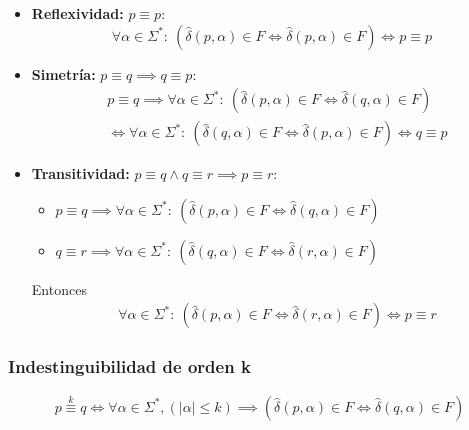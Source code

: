 \begin{demo}[0.8\textwidth]
  \begin{itemize}
    \item \textbf{Reflexividad:} \(p\equiv p\):
          \[ \forall \alpha \in \Sigma^*:~(\hat\delta(p,\alpha) \in F \iff \hat\delta(p,\alpha) \in F) \iff p \equiv p \]
    \item \textbf{Simetría:} \(p\equiv q \implies q\equiv p\):
          \begin{align*}
             & p \equiv q \implies \forall \alpha \in \Sigma^*:~(\hat\delta(p,\alpha) \in F \iff \hat\delta(q,\alpha) \in F)  \\
             & \iff \forall \alpha \in \Sigma^*:~(\hat\delta(q,\alpha) \in F \iff \hat\delta(p,\alpha) \in F) \iff q \equiv p
          \end{align*}
    \item \textbf{Transitividad:} \(p\equiv q \land q\equiv r \implies p\equiv r\):
          \begin{itemize}
            \item[] \(p \equiv q \implies \forall \alpha \in \Sigma^*:~(\hat\delta(p,\alpha) \in F \iff \hat\delta(q,\alpha) \in F)\)
            \item[] \(q \equiv r \implies \forall \alpha \in \Sigma^*:~(\hat\delta(q,\alpha) \in F \iff \hat\delta(r,\alpha) \in F)\)
          \end{itemize}
          Entonces
          \begin{align*}
             & \forall \alpha \in \Sigma^*:~(\hat\delta(p,\alpha) \in F \iff \hat\delta(r,\alpha) \in F) \iff p \equiv r
          \end{align*}
  \end{itemize}
\end{demo}

\subsubsection{Indestinguibilidad de orden k}
\[ p \overset{k}{\equiv} q \iff \forall \alpha\in\Sigma^*, (|\alpha|\leq k) \implies (\hat\delta(p,\alpha) \in F \iff \hat\delta(q,\alpha) \in F)\]

